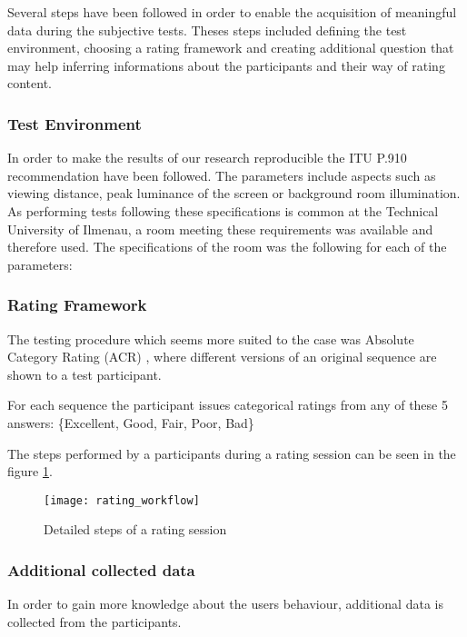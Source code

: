 Several steps have been followed in order to enable the acquisition of meaningful data during the subjective tests. Theses steps included defining the test environment, choosing a rating framework and creating additional question that may help inferring informations about the participants and their way of rating content.

\subsubsection{Test Environment}
In order to make the results of our research reproducible the ITU P.910 recommendation \cite{rec1998p} have been followed. 
The parameters include aspects such as viewing distance, peak luminance of the screen or background room illumination.
As performing tests following these specifications is common at the Technical University of Ilmenau, a room meeting these requirements was available and therefore used.
The specifications of the room was the following for each of the parameters:


	
\subsubsection{Rating Framework}
The testing procedure which seems more suited to the case was Absolute Category Rating (ACR) \cite{rec1998p}, where different versions of an original sequence are shown to a test participant. 

For each sequence the participant issues categorical ratings from any of these 5 answers: \{Excellent, Good, Fair, Poor, Bad\}


The steps performed by a participants during a rating session can be seen in the figure \ref{fig:workflow:state_machine}.

\begin{figure}[h]
	\centering
	\texttt{[image: rating\_workflow]}
	\caption{Detailed steps of a rating session}
	\label{fig:workflow:state_machine}
\end{figure}

\subsubsection{Additional collected data}
In order to gain more knowledge about the users behaviour, additional data is collected from the participants.

